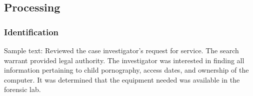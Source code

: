 \subsection{Processing}
\subsubsection{Identification}

Sample text:
Reviewed the case investigator’s request for service. The search warrant provided legal authority. The investigator was interested in finding all information pertaining to child pornography, access dates, and ownership of the computer. It was determined that the equipment needed was available in the forensic lab. 